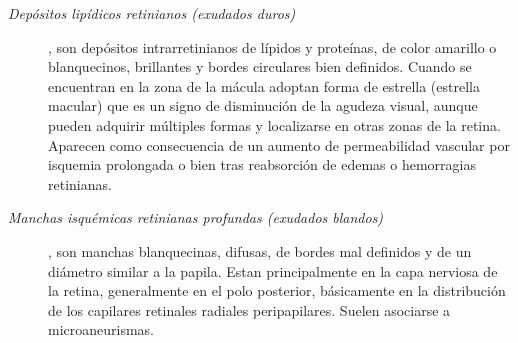 \begin{description}
\begin{description}
\begin{description}
	\item[\normalfont\textit{Dep\'ositos lip\'idicos retinianos (exudados duros)}],\cite{niemeijer2007automated} son dep\'ositos intrarretinianos de l\'ipidos y prote\'inas, de color amarillo o blanquecinos, brillantes y bordes circulares bien definidos. Cuando se encuentran en la zona de la m\'acula adoptan forma de estrella (estrella macular) que es un signo de disminuci\'on de la agudeza visual, aunque pueden adquirir m\'ultiples formas y localizarse en otras zonas de la retina. Aparecen como consecuencia de un aumento de permeabilidad vascular por isquemia prolongada o bien tras reabsorci\'on de edemas o hemorragias retinianas. 
\item[\normalfont\textit{ Manchas isqu\'emicas retinianas profundas (exudados blandos)}], son manchas blanquecinas, difusas, de bordes mal definidos y de un di\'ametro similar a la papila. Estan principalmente en la capa nerviosa de la retina, generalmente en el polo posterior, b\'asicamente en la distribuci\'on de los capilares retinales radiales peripapilares. Suelen asociarse a microaneurismas.\cite{niemeijer2007automated}
\end{description}
\end{description}


\end{description}
